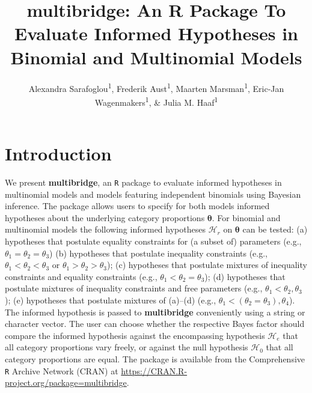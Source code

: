 \documentclass[
  english,
  man,floatsintext]{apa6}
\title{multibridge: An R Package To Evaluate Informed Hypotheses in Binomial and Multinomial Models}
\author{Alexandra Sarafoglou\textsuperscript{1}, Frederik Aust\textsuperscript{1}, Maarten Marsman\textsuperscript{1}, Eric-Jan Wagenmakers\textsuperscript{1}, \& Julia M. Haaf\textsuperscript{1}}
\date{}
\affiliation{\vspace{0.5cm}\textsuperscript{1} University of Amsterdam}
\begin{document}
\maketitle

\hypertarget{introduction}{%
\section{Introduction}\label{introduction}}

We present \textbf{multibridge}, an \texttt{R} package to evaluate informed hypotheses in multinomial models and models featuring independent binomials using Bayesian inference. The package allows users to specify for both models informed hypotheses about the underlying category proportions \(\boldsymbol{\theta}\). For binomial and multinomial models the following informed hypotheses \(\mathcal{H}_r\) on \(\boldsymbol{\theta}\) can be tested: (a) hypotheses that postulate equality constraints for (a subset of) parameters (e.g., \(\theta_1 = \theta_2 = \theta_3\)) (b) hypotheses that postulate inequality constraints (e.g., \(\theta_1 < \theta_2 < \theta_3\) or \(\theta_1 > \theta_2 > \theta_3\)); (c) hypotheses that postulate mixtures of inequality constraints and equality constraints (e.g., \(\theta_1 < \theta_2 = \theta_3\)); (d) hypotheses that postulate mixtures of inequality constraints and free parameters (e.g., \(\theta_1 < \theta_2 , \theta_3\)); (e) hypotheses that postulate mixtures of (a)--(d) (e.g., \(\theta_1 < (\theta_2 = \theta_3) , \theta_4\)). The informed hypothesis is passed to \textbf{multibridge} conveniently using a string or character vector. The user can choose whether the respective Bayes factor should compare the informed hypothesis against the encompassing hypothesis \(\mathcal{H}_e\) that all category proportions vary freely, or against the null hypothesis \(\mathcal{H}_0\) that all category proportions are equal. The package is available from the Comprehensive \texttt{R} Archive Network (CRAN) at \url{https://CRAN.R-project.org/package=multibridge}.
\end{document}

